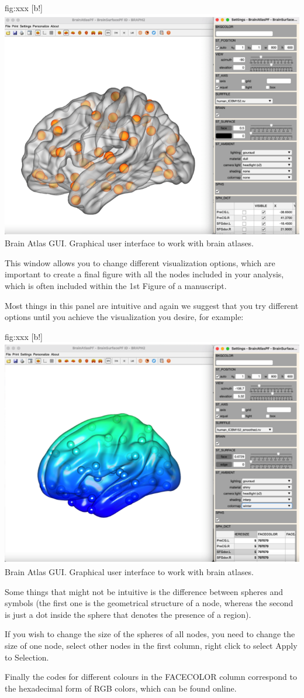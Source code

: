 \documentclass{tufte-handout}
\begin{document}
	{fig:xxx}
	{
	[b!]
	\includegraphics{tut_ba/fig3.png}
	}
	{Brain Atlas GUI.}
	{
	Graphical user interface to work with brain atlases. 
	}

This window allows you to change different visualization options, which are important to create a final figure with all the nodes included in your analysis, which is often included within the 1st Figure of a manuscript.


Most things in this panel are intuitive and again we suggest that you try different options until you achieve the visualization you desire, for example:

	{fig:xxx}
	{
	[b!]
	\includegraphics{tut_ba/fig4.png}
	}
	{Brain Atlas GUI.}
	{
	Graphical user interface to work with brain atlases. 
	}


Some things that might not be intuitive is the difference between spheres and symbols (the first one is the geometrical structure of a node, whereas the second is just a dot inside the sphere that denotes the presence of a region). 


If you wish to change the size of the spheres of all nodes, you need to change the size of one node, select other nodes in the first column, right click to select Apply to Selection.


Finally the codes for different colours in the FACECOLOR column correspond to the hexadecimal form of RGB colors, which can be found online.
\end{document}
